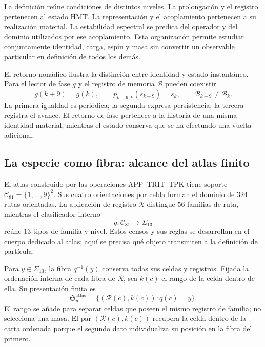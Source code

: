 La definición reúne condiciones de distintos niveles. La prolongación
y el registro pertenecen al estado HMT. La representación y el
acoplamiento pertenecen a su realización material. La estabilidad
espectral se predica del operador y del dominio utilizados por ese
acoplamiento. Esta organización permite estudiar conjuntamente identidad,
carga, espín y masa sin convertir un observable particular en definición
de todos los demás.

El retorno nonádico ilustra la distinción entre identidad y estado
instantáneo. Para el lector de fase $g$ y el registro de memoria
$\mathcal B$ pueden coexistir
\begin{equation}
 g(k+9)=g(k),\qquad
 p_{k+9,k}(s_{k+9})=s_k,\qquad
 \mathcal B_{k+9}\ne\mathcal B_k.
 \label{vi:eq:persistencia-fase-memoria}
\end{equation}
La primera igualdad es periódica; la segunda expresa persistencia; la
tercera registra el avance. El retorno de fase pertenece a la historia
de una misma identidad material, mientras el estado conserva que se ha
efectuado una vuelta adicional.

\subsection{La especie como fibra: alcance del atlas finito}
\label{vi:subsec:especie-fibra}

El atlas construido por las operaciones APP--TRIT--TPK tiene soporte
$\mathcal C_{81}=\{1,\ldots,9\}^2$. Sus cuatro orientaciones por
celda forman el dominio de $324$ rutas orientadas. La aplicación de
registro $\mathcal R$ distingue $56$ familias de ruta, mientras el
clasificador interno
\begin{equation}
 q:\mathcal C_{81}\longrightarrow\Sigma_{13}
 \label{vi:eq:clasificador-especies}
\end{equation}
reúne $13$ tipos de familia y nivel. Estos censos y sus reglas se
desarrollan en el cuerpo dedicado al atlas; aquí se precisa qué objeto
transmiten a la definición de partícula.

Para $y\in\Sigma_{13}$, la fibra $q^{-1}(y)$ conserva todas sus
celdas y registros. Fijada la ordenación interna de cada fibra de
$\mathcal R$, sea $k(c)$ el rango de la celda dentro de ella. Su
presentación finita es
\begin{equation}
 \mathfrak S_y^{\mathrm{atlas}}
 =\{(\mathcal R(c),k(c)):q(c)=y\}.
 \label{vi:eq:multiseccion-atlas}
\end{equation}
El rango se añade para separar celdas que poseen el mismo registro de
familia; no selecciona una masa. El par $(\mathcal R(c),k(c))$
recupera la celda dentro de la carta ordenada porque el segundo dato
individualiza su posición en la fibra del primero.

